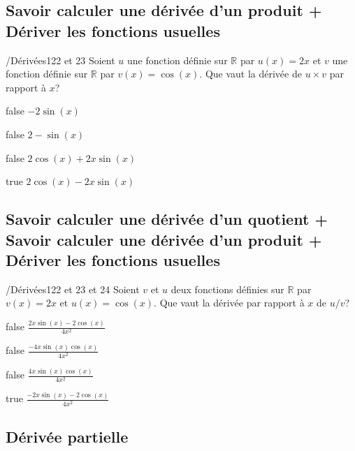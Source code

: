 \documentclass[11pt]{article}
\begin{document}
			  \subsection{Savoir calculer une dérivée d'un produit + Dériver les fonctions usuelles}
        
        	\begin{question}{/}{Dérivées}{1}{22 et 23}
				Soient $u$ une fonction définie sur $\mathbb{R}$ par $u(x)=2x$ et $v$ une fonction définie sur $\mathbb{R}$ par  $v(x)=\cos(x)$. Que vaut la dérivée de $u\times v$ par rapport à $x$?
            \end{question}

            \begin{reponses}
            	\item[false] $-2\sin(x)$
            	\item[false] $2-\sin(x)$
                \item[false] $2\cos(x)+2x\sin(x)$
                \item[true] $2\cos(x)-2x\sin(x)$
            \end{reponses}
 \subsection{Savoir calculer une dérivée d'un quotient + Savoir calculer une dérivée d'un produit + Dériver les fonctions usuelles}
        
        	\begin{question}{/}{Dérivées}{1}{22 et 23 et 24}
				Soient $v$ et $u$ deux fonctions définies sur $\mathbb{R}$ par $v(x)=2x$ et $u(x)=\cos(x)$. Que vaut la dérivée par rapport à $x$ de $u/v$?
            \end{question}

            \begin{reponses}
            	\item[false] $\frac{2x\sin(x)-2\cos(x)}{4x^2}$
            	\item[false] $\frac{-4x\sin(x)\cos(x)}{4x^2}$
                \item[false] $\frac{4x\sin(x)\cos(x)}{4x^2}$
                \item[true] $\frac{-2x\sin(x)-2\cos(x)}{4x^2}$
            \end{reponses}
			
            
        \subsection{Dérivée partielle} 
         
\end{document}
